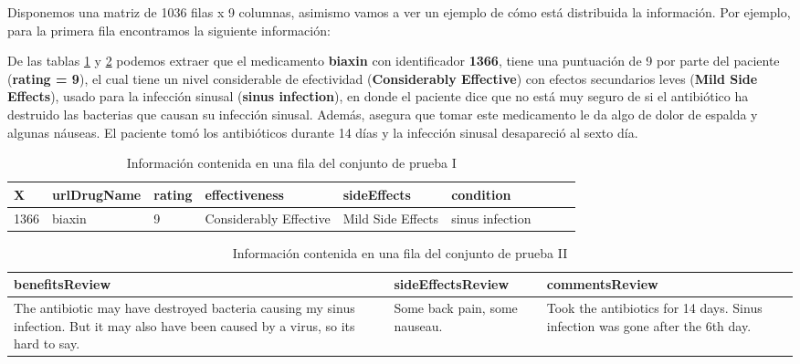 \documentclass[spanish,]{article}
\begin{document}
Disponemos una matriz de 1036 filas x 9 columnas, asimismo vamos a ver
un ejemplo de cómo está distribuida la información. Por ejemplo, para la
primera fila encontramos la siguiente información:

De las tablas \ref{tabla:datos_testI} y \ref{tabla:datos_testII} podemos
extraer que el medicamento \textbf{biaxin} con identificador
\textbf{1366}, tiene una puntuación de 9 por parte del paciente
(\textbf{rating = 9}), el cual tiene un nivel considerable de
efectividad (\textbf{Considerably Effective}) con efectos secundarios
leves (\textbf{Mild Side Effects}), usado para la infección sinusal
(\textbf{sinus infection}), en donde el paciente dice que no está muy
seguro de si el antibiótico ha destruido las bacterias que causan su
infección sinusal. Además, asegura que tomar este medicamento le da algo
de dolor de espalda y algunas náuseas. El paciente tomó los antibióticos
durante 14 días y la infección sinusal desapareció al sexto día.

\begin{table}[h]
  \centering
    \begin{tabular}{|l|l|l|l|l|l|l|l|l|}
      \hline
      \rowcolor[rgb]{0.94,0.97,1.0} \textbf{X} & \textbf{urlDrugName} & \textbf{rating} & \textbf{effectiveness} 
      & \textbf{sideEffects} &\textbf{condition} \\ \hline
      1366 & biaxin & 9 & Considerably Effective & Mild Side Effects & sinus infection  \\ \hline
    \end{tabular}
  \caption{Información contenida en una fila del conjunto de prueba I}
  \label{tabla:datos_testI}
\end{table}

\begin{table}[h]
  \centering
    \begin{tabular}{|m{7cm}|m{3cm}|m{5cm}|}
      \hline
      \rowcolor[rgb]{0.94,0.97,1.0} \textbf{benefitsReview} & \textbf{sideEffectsReview} & \textbf{commentsReview} \\ \hline
      The antibiotic may have destroyed bacteria causing my sinus infection. But it may also have been caused by a virus, so its hard to say. & Some back pain, some nauseau. & Took the antibiotics for 14 days. Sinus infection was gone after the 6th day. \\ \hline
    \end{tabular}
  \caption{Información contenida en una fila del conjunto de prueba II}
  \label{tabla:datos_testII}
\end{table}
\end{document}
